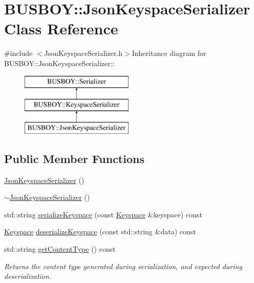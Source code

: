 \hypertarget{classBUSBOY_1_1JsonKeyspaceSerializer}{
\section{BUSBOY::JsonKeyspaceSerializer Class Reference}
\label{classBUSBOY_1_1JsonKeyspaceSerializer}
}


{\ttfamily \#include $<$JsonKeyspaceSerializer.h$>$}Inheritance diagram for BUSBOY::JsonKeyspaceSerializer::\begin{figure}[H]
\begin{center}
\leavevmode
\includegraphics[height=3cm]{classBUSBOY_1_1JsonKeyspaceSerializer}
\end{center}
\end{figure}
\subsection*{Public Member Functions}
\begin{DoxyCompactItemize}
\item 
\hyperlink{classBUSBOY_1_1JsonKeyspaceSerializer_a241b1957f194b7d4e17febb5b7c56a42}{JsonKeyspaceSerializer} ()
\item 
\hyperlink{classBUSBOY_1_1JsonKeyspaceSerializer_a62270f52f841bbee25f6366b61d7bbf8}{$\sim$JsonKeyspaceSerializer} ()
\item 
std::string \hyperlink{classBUSBOY_1_1JsonKeyspaceSerializer_a563aae12209fef1d370e7a6b9cde5fe8}{serializeKeyspace} (const \hyperlink{classBUSBOY_1_1Keyspace}{Keyspace} \&keyspace) const 
\item 
\hyperlink{classBUSBOY_1_1Keyspace}{Keyspace} \hyperlink{classBUSBOY_1_1JsonKeyspaceSerializer_a56484d5a6fe986dc5e1cb3abcd3e8d00}{deserializeKeyspace} (const std::string \&data) const 
\item 
std::string \hyperlink{classBUSBOY_1_1JsonKeyspaceSerializer_a3fb88c9ae3f198a5aba3ba8a69337f9c}{getContentType} () const 
\begin{DoxyCompactList}\small\item\em Returns the content type generated during serialization, and expected during deserialization. \item\end{DoxyCompactList}\end{DoxyCompactItemize}


